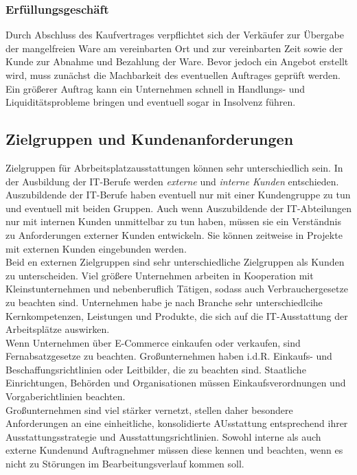 \documentclass[a4paper, 12pt]{report}
\begin{document}
\subsubsection{Erfüllungsgeschäft}

Durch Abschluss des Kaufvertrages verpflichtet sich der Verkäufer zur Übergabe 
der mangelfreien Ware am vereinbarten Ort und zur vereinbarten Zeit sowie der 
Kunde zur Abnahme und Bezahlung der Ware. Bevor jedoch ein Angebot erstellt 
wird, muss zunächst die Machbarkeit des eventuellen Auftrages geprüft werden. 
Ein größerer Auftrag kann ein Unternehmen schnell in Handlungs- und 
Liquiditätsprobleme bringen und eventuell sogar in Insolvenz führen. 

\subsection{Zielgruppen und Kundenanforderungen}

Zielgruppen für Abrbeitsplatzausstattungen können sehr unterschiedlich sein. In 
der Ausbildung der IT-Berufe werden \emph{externe} und \emph{interne Kunden} 
entschieden. Auszubildende der IT-Berufe haben eventuell nur mit einer 
Kundengruppe zu tun und eventuell mit beiden Gruppen. Auch wenn Auszubildende 
der IT-Abteilungen nur mit internen Kunden unmittelbar zu tun haben, müssen sie 
ein Verständnis zu Anforderungen externer Kunden entwickeln. Sie können 
zeitweise in Projekte mit externen Kunden eingebunden werden. \\

Beid en externen Zielgruppen sind sehr unterschiedliche Zielgruppen als Kunden 
zu unterscheiden. Viel größere Unternehmen arbeiten in Kooperation mit 
Kleinstunternehmen und nebenberuflich Tätigen, sodass auch Verbrauchergesetze zu 
beachten sind. Unternehmen habe je nach Branche sehr unterschiedlcihe 
Kernkompetenzen, Leistungen und Produkte, die sich auf die IT-Ausstattung der 
Arbeitsplätze auswirken. \\

Wenn Unternehmen über E-Commerce einkaufen oder verkaufen, sind 
Fernabsatzgesetze zu beachten. Großunternehmen haben i.d.R. Einkaufs- und 
Beschaffungsrichtlinien oder Leitbilder, die zu beachten sind. Staatliche 
Einrichtungen, Behörden und Organisationen müssen Einkaufsverordnungen und 
Vorgaberichtlinien beachten. \\

Großunternehmen sind viel stärker vernetzt, stellen daher besondere 
Anforderungen an eine einheitliche, konsolidierte AUsstattung entsprechend ihrer
Ausstattungsstrategie und Ausstattungsrichtlinien. Sowohl interne als auch 
externe Kundenund Auftragnehmer müssen diese kennen und beachten, wenn es nicht 
zu Störungen im Bearbeitungsverlauf kommen soll. 
\end{document}
